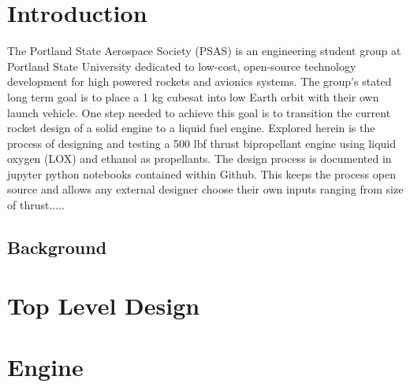 \documentclass[]{aiaa-tc}%
\begin{document}
\section{Introduction}

The Portland State Aerospace Society (PSAS) is an engineering student group at Portland State University dedicated to low-cost, open-source technology development for high powered rockets and avionics systems. The group’s stated long term goal is to place a 1 kg cubesat into low Earth orbit with their own launch vehicle. One step needed to achieve this goal is to transition the current rocket design of a solid engine to a liquid fuel engine. Explored herein is the process of designing and testing a 500 lbf thrust bipropellant engine using liquid oxygen (LOX) and ethanol as propellants. The design process is documented in jupyter python notebooks contained within Github. This keeps the process open source and allows any external designer choose their own inputs ranging from size of thrust.....


\subsection{Background}

\section{Top Level Design}

\section{Engine}
\end{document}
